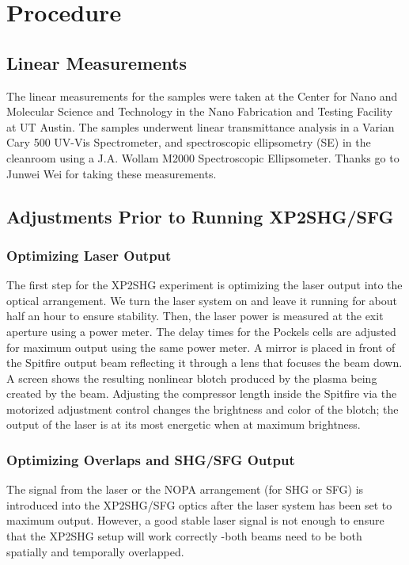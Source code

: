 \section{Procedure}
\subsection{Linear Measurements}
The linear measurements for the samples were taken at the Center for Nano and Molecular Science and Technology in the Nano Fabrication and Testing Facility at UT Austin. The samples underwent linear transmittance analysis in a Varian Cary 500 UV-Vis Spectrometer, and spectroscopic ellipsometry (SE) in the cleanroom using a J.A. Wollam M2000 Spectroscopic Ellipsometer. Thanks go to Junwei Wei for taking these measurements.

\subsection{Adjustments Prior to Running XP2SHG/SFG}

\subsubsection{Optimizing Laser Output}
The first step for the XP2SHG experiment is optimizing the laser output into the optical arrangement. We turn the laser system on and  leave it running for about half an hour to ensure stability. Then, the laser power is measured at the exit aperture using a power meter. The delay times for the Pockels cells are adjusted for maximum output using the same power meter. A mirror is placed in front of the Spitfire output beam reflecting it through a lens that focuses the beam down. A screen shows the resulting nonlinear blotch produced by the plasma being created by the beam. Adjusting the compressor length inside the Spitfire via the motorized adjustment control changes the brightness and color of the blotch; the output of the laser is at its most energetic when at maximum brightness.

\subsubsection{Optimizing Overlaps and SHG/SFG Output}
The signal from the laser or the NOPA arrangement (for SHG or SFG) is introduced into the XP2SHG/SFG optics after the laser system has been set to maximum output. However, a good stable laser signal is not enough to ensure that the XP2SHG setup will work correctly -both beams need to be both spatially and temporally overlapped.

